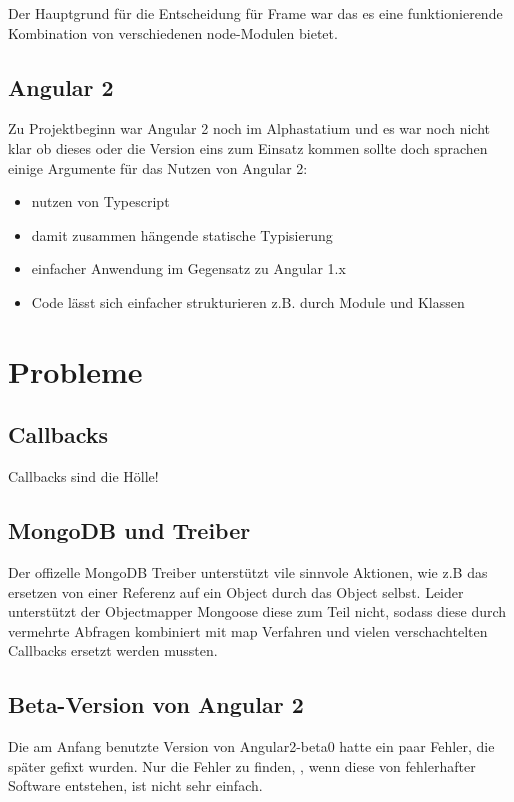 \documentclass[12pt]{article} %
\begin{document}
Der Hauptgrund für die Entscheidung für Frame war das es eine funktionierende Kombination von verschiedenen node-Modulen bietet.


\subsection{Angular 2}

Zu Projektbeginn war Angular 2 noch im Alphastatium und es war noch nicht klar ob dieses oder die Version eins zum Einsatz kommen sollte doch sprachen einige Argumente für das Nutzen von Angular 2:

\begin{itemize}
  \item nutzen von Typescript
  \item damit zusammen hängende statische Typisierung
  \item einfacher Anwendung im Gegensatz zu Angular 1.x
  \item Code lässt sich einfacher strukturieren z.B. durch Module und Klassen
\end{itemize}





\section{Probleme}

\subsection{Callbacks}
Callbacks sind die Hölle!

\subsection{MongoDB und Treiber}
Der offizelle MongoDB Treiber unterstützt vile sinnvole Aktionen, wie z.B das ersetzen von einer Referenz auf ein Object durch das Object selbst. Leider unterstützt der Objectmapper Mongoose diese zum Teil nicht, sodass diese durch vermehrte Abfragen kombiniert mit map Verfahren und vielen verschachtelten Callbacks ersetzt werden mussten.

\subsection{Beta-Version von Angular 2}
Die am Anfang benutzte Version von Angular2-beta0 hatte ein paar Fehler, die später gefixt wurden. Nur die Fehler zu finden, , wenn diese von fehlerhafter Software entstehen, ist nicht sehr einfach.
\end{document}
